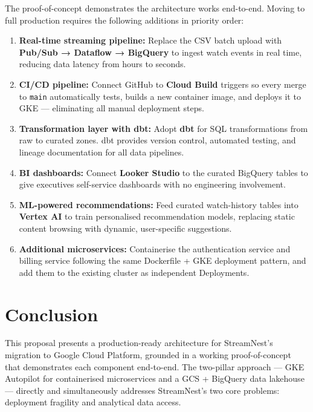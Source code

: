 \documentclass[12pt, a4paper]{article}
\begin{document}
The proof-of-concept demonstrates the architecture works end-to-end. Moving to full production requires the following additions in priority order:

\begin{enumerate}
    \item \textbf{Real-time streaming pipeline:} Replace the CSV batch upload with \textbf{Pub/Sub → Dataflow → BigQuery} to ingest watch events in real time, reducing data latency from hours to seconds.

    \item \textbf{CI/CD pipeline:} Connect GitHub to \textbf{Cloud Build} triggers so every merge to \texttt{main} automatically tests, builds a new container image, and deploys it to GKE — eliminating all manual deployment steps.

    \item \textbf{Transformation layer with dbt:} Adopt \textbf{dbt} for SQL transformations from raw to curated zones. dbt provides version control, automated testing, and lineage documentation for all data pipelines.

    \item \textbf{BI dashboards:} Connect \textbf{Looker Studio} to the curated BigQuery tables to give executives self-service dashboards with no engineering involvement.

    \item \textbf{ML-powered recommendations:} Feed curated watch-history tables into \textbf{Vertex AI} to train personalised recommendation models, replacing static content browsing with dynamic, user-specific suggestions.

    \item \textbf{Additional microservices:} Containerise the authentication service and billing service following the same Dockerfile + GKE deployment pattern, and add them to the existing cluster as independent Deployments.
\end{enumerate}

\section{Conclusion}

This proposal presents a production-ready architecture for StreamNest's migration to Google Cloud Platform, grounded in a working proof-of-concept that demonstrates each component end-to-end. The two-pillar approach — GKE Autopilot for containerised microservices and a GCS + BigQuery data lakehouse — directly and simultaneously addresses StreamNest's two core problems: deployment fragility and analytical data access.
\end{document}

